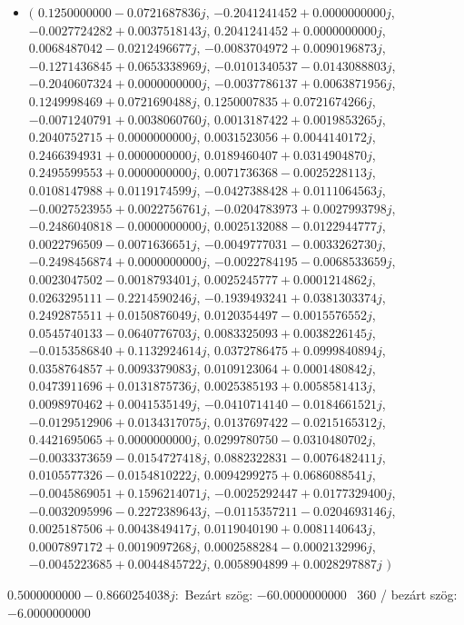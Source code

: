 \documentclass[14pt,a4paper]{article}
\begin{document}
\begin{itemize}
\item
$\big($
$0.1250000000-0.0721687836j$, $-0.2041241452+0.0000000000j$, $-0.0027724282+0.0037518143j$, $0.2041241452+0.0000000000j$, $0.0068487042-0.0212496677j$, $-0.0083704972+0.0090196873j$, $-0.1271436845+0.0653338969j$, $-0.0101340537-0.0143088803j$, $-0.2040607324+0.0000000000j$, $-0.0037786137+0.0063871956j$, $0.1249998469+0.0721690488j$, $0.1250007835+0.0721674266j$, $-0.0071240791+0.0038060760j$, $0.0013187422+0.0019853265j$, $0.2040752715+0.0000000000j$, $0.0031523056+0.0044140172j$, $0.2466394931+0.0000000000j$, $0.0189460407+0.0314904870j$, $0.2495599553+0.0000000000j$, $0.0071736368-0.0025228113j$, $0.0108147988+0.0119174599j$, $-0.0427388428+0.0111064563j$, $-0.0027523955+0.0022756761j$, $-0.0204783973+0.0027993798j$, $-0.2486040818-0.0000000000j$, $0.0025132088-0.0122944777j$, $0.0022796509-0.0071636651j$, $-0.0049777031-0.0033262730j$, $-0.2498456874+0.0000000000j$, $-0.0022784195-0.0068533659j$, $0.0023047502-0.0018793401j$, $0.0025245777+0.0001214862j$, $0.0263295111-0.2214590246j$, $-0.1939493241+0.0381303374j$, $0.2492875511+0.0150876049j$, $0.0120354497-0.0015576552j$, $0.0545740133-0.0640776703j$, $0.0083325093+0.0038226145j$, $-0.0153586840+0.1132924614j$, $0.0372786475+0.0999840894j$, $0.0358764857+0.0093379083j$, $0.0109123064+0.0001480842j$, $0.0473911696+0.0131875736j$, $0.0025385193+0.0058581413j$, $0.0098970462+0.0041535149j$, $-0.0410714140-0.0184661521j$, $-0.0129512906+0.0134317075j$, $0.0137697422-0.0215165312j$, $0.4421695065+0.0000000000j$, $0.0299780750-0.0310480702j$, $-0.0033373659-0.0154727418j$, $0.0882322831-0.0076482411j$, $0.0105577326-0.0154810222j$, $0.0094299275+0.0686088541j$, $-0.0045869051+0.1596214071j$, $-0.0025292447+0.0177329400j$, $-0.0032095996-0.2272389643j$, $-0.0115357211-0.0204693146j$, $0.0025187506+0.0043849417j$, $0.0119040190+0.0081140643j$, $0.0007897172+0.0019097268j$, $0.0002588284-0.0002132996j$, $-0.0045223685+0.0044845722j$, $0.0058904899+0.0028297887j$
$\big)$
\end{itemize}
$0.5000000000-0.8660254038j$:\
Bezárt szög: $-60.0000000000$ \
360 / bezárt szög: $-6.0000000000$\
\end{document}
